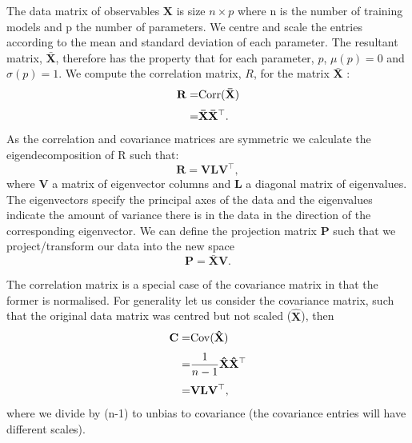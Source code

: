 The data matrix of observables $\mathbf{X}$ is size $n \times p$ where n is the number of training models and p the number of parameters.
We centre and scale the entries according to the mean and standard deviation of each parameter.
The resultant matrix,  $\mathbf{\bar{X}}$, therefore has the property that for each parameter, $p$, $\mu(p) =0$ and $\sigma(p) =1$. 
We compute the correlation matrix, $R$, for the matrix  $\mathbf{\bar{X}}$ :
\begin{eqnarray}
    \mathbf{R}  = &\rm{Corr}(\mathbf{\bar{X}}) \\[3pt] \nonumber
                = & \mathbf{\bar{X}}\mathbf{\bar{X}^\top}.  
\end{eqnarray}
As the correlation and covariance matrices are symmetric we calculate the eigendecomposition of R such that:
\begin{equation}
\mathbf{R}=\mathbf{VLV^\top},
\end{equation}  
where \textbf{V} a matrix of eigenvector columns and \textbf{L} a diagonal matrix of eigenvalues.
The eigenvectors specify the principal axes of the data and the eigenvalues indicate the amount of variance there is in the data in the direction of the corresponding eigenvector.
We can define the projection matrix \textbf{P} such that we project/transform our data into the new space    
\begin{equation}
\mathbf{P} = \mathbf{\bar{X}}  \mathbf{V}.
\end{equation}


The correlation matrix is a special case of the covariance matrix in that the former is normalised.
For generality let us consider the covariance matrix, such that the original data matrix was centred but not scaled ($\mathbf{\hat{X}}$), then
\begin{eqnarray}
    \mathbf{C}  = &\rm{Cov}(\mathbf{\hat{X}}) \\[3pt] \nonumber
                = & \frac{1}{n-1}\mathbf{\hat{X}}\mathbf{\hat{X}^\top}\\[3pt] \nonumber
                = & \mathbf{V} \mathbf{L} \mathbf{V^\top},
\end{eqnarray}
where we divide by (n-1) to unbias to covariance (the covariance entries will have different scales).

